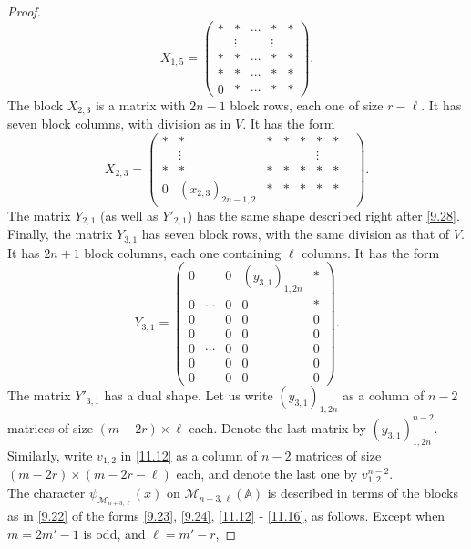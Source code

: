 \documentclass[12pts]{amsart}
\newcommand{\BA}{{\mathbb {A}}}
\begin{document}
\begin{proof}
\begin{equation}\label{11.14}
X_{1,5}=\begin{pmatrix}\ast&\ast&\cdots&\ast&\ast\\
&\vdots&&\vdots\\\ast&\ast&\cdots&\ast&\ast\\\ast&\ast&\cdots&\ast&\ast\\0&\ast&\cdots&\ast&\ast\end{pmatrix}.
\end{equation}
The block $X_{2,3}$ is a matrix with $2n-1$ block rows, each one of size $r-\ell$. It has seven block columns, with division as in $V$. It has the form
\begin{equation}\label{11.15}
X_{2,3}=\begin{pmatrix}\ast&\ast&\ast&\ast&\ast&\ast&\ast\\&\vdots&&&&\vdots&&\\\ast&\ast&\ast&\ast&\ast&\ast&\ast\\0&(x_{2,3})_{2n-1,2}&\ast&\ast&\ast&\ast&\ast\end{pmatrix}.
\end{equation}
The matrix $Y_{2,1}$ (as well as $Y'_{2,1}$) has the same shape described right after \eqref{9.28}. Finally, the matrix $Y_{3,1}$ has seven block rows, with the same division as that of $V$. It has $2n+1$ block columns, each one containing $\ell$ columns. It has the form\begin{equation}\label{11.16}
Y_{3,1}=\begin{pmatrix}0&&0&(y_{3,1})_{1,2n}&\ast\\0&\cdots&0&0&\ast\\
0&&0&0&0\\0&&0&0&0\\0&\cdots&0&0&0\\0&&0&0&0\\0&&0&0&0\end{pmatrix}.
\end{equation}
The matrix $Y'_{3,1}$ has a dual shape. Let us write $(y_{3,1})_{1,2n}$ as a column of $n-2$ matrices of size $(m-2r)\times \ell$ each. Denote the last matrix by $(y_{3,1})_{1,2n}^{n-2}$. Similarly, write $v_{1,2}$ in \eqref{11.12} as a column of $n-2$ matrices of size $(m-2r)\times (m-2r-\ell)$ each, and denote the last one by $v_{1,2}^{n-2}$.\\
The character $\psi_{\mathcal{M}_{n+3,\ell}}(x)$ on $\mathcal{M}_{n+3,\ell}(\BA)$ is described in terms of the blocks as in \eqref{9.22} of the forms \eqref{9.23}, \eqref{9.24}, \eqref{11.12} - \eqref{11.16}, as follows. Except when $m=2m'-1$ is odd, and $\ell=m'-r$,

\end{proof}
\end{document}
